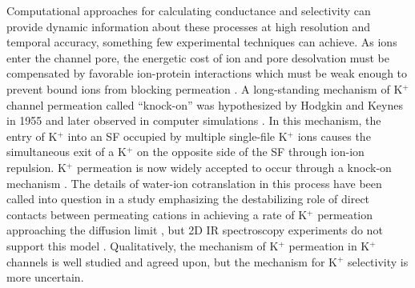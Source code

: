 \begin{refsection}
Computational approaches for calculating conductance and selectivity can provide dynamic information about these processes at high resolution and temporal accuracy, something few experimental techniques can achieve. As ions enter the channel pore, the energetic cost of ion and pore desolvation must be compensated by favorable ion-protein interactions which must be weak enough to prevent bound ions from blocking permeation \cite{Roux:2011ed,Alam:2011ud}.  A long-standing mechanism of K$^+$ channel permeation called ``knock-on'' was hypothesized by Hodgkin and Keynes in 1955 \cite{Hodgkin:1955hu} and later observed in computer simulations \cite{Berneche:2003ua,Berneche:2001un}. In this mechanism, the entry of K$^+$ into an SF occupied by multiple single-file K$^+$ ions causes the simultaneous exit of a K$^+$ on the opposite side of the SF through ion-ion repulsion. K$^+$ permeation is now widely accepted to occur through a knock-on mechanism \cite{Domene:2003tn,Jensen:2010fd,Aqvist:2000eo,Roux:2005kd}. The details of water-ion cotranslation in this process have been called into question in a study emphasizing the destabilizing role of direct contacts between permeating cations in achieving a rate of K$^+$ permeation approaching the diffusion limit \cite{Kopfer:2014cj}, but 2D IR spectroscopy experiments do not support this model \cite{Kratochvil:2016jx}. Qualitatively, the mechanism of K$^+$ permeation in K$^+$ channels is well studied and agreed upon, but the mechanism for K$^+$ selectivity is more uncertain.


\end{refsection}
